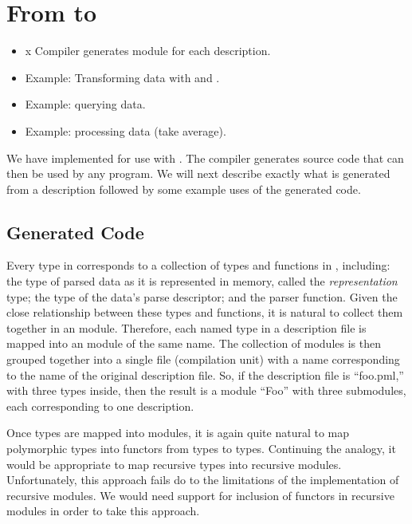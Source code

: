 
\section{From \padsmlbig{} to \ocaml{}}
\label{sec:padsml-impl}

\begin{itemize}
\item x Compiler generates module for each description.
\item Example: Transforming data with \padsml{} and \ocaml{}.
\item Example: querying data.
\item Example: processing data (take average).
\end{itemize}

We have implemented \padsml{} for use with \ocaml{}. The \padsml{}
compiler generates \ocaml{} source code that can then be used by any
\ocaml{} program. We will next describe exactly what is generated from
a description followed by some example uses of the generated code.

\subsection{Generated Code}
\label{sec:gen-code}

Every type in \padsml{} corresponds to a collection of types and
functions in \ocaml{}, including: the type of parsed data as it is represented in
memory, called the \textit{representation} type; the type of the data's
parse descriptor; and the parser function. Given the close relationship
between these types and functions, it is natural to collect them
together in an \ocaml{} module. Therefore, each named type in a
description file is mapped into an \ocaml module of the same
name. The collection of modules is then grouped together into a single
file (compilation unit) with a name corresponding to the name of the
original description file. So, if the description file is ``foo.pml,''
with three types inside, then the result is a module ``Foo'' with
three submodules, each corresponding to one description.

Once types are mapped into modules, it is again quite
natural to map polymorphic types into functors from types to
types. Continuing the analogy, it would be appropriate to map
recursive types into recursive modules. Unfortunately, this approach
fails do to the limitations of the \ocaml{} implementation of
recursive modules. We would need support for inclusion of functors in
recursive modules in order to take this approach.

